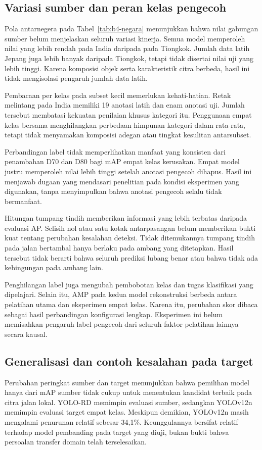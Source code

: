 \subsection{Variasi sumber dan peran kelas pengecoh}
Pola antarnegera pada Tabel~\ref{tab:b4-negara} menunjukkan bahwa nilai gabungan sumber belum menjelaskan seluruh variasi kinerja. Semua model memperoleh nilai yang lebih rendah pada India daripada pada Tiongkok. Jumlah data latih Jepang juga lebih banyak daripada Tiongkok, tetapi tidak disertai nilai uji yang lebih tinggi. Karena komposisi objek serta karakteristik citra berbeda, hasil ini tidak mengisolasi pengaruh jumlah data latih.

Pembacaan per kelas pada subset kecil memerlukan kehati-hatian. Retak melintang pada India memiliki 19 anotasi latih dan enam anotasi uji. Jumlah tersebut membatasi kekuatan penilaian khusus kategori itu. Penggunaan empat kelas bersama menghilangkan perbedaan himpunan kategori dalam rata-rata, tetapi tidak menyamakan komposisi adegan atau tingkat kesulitan antarsubset.

Perbandingan label tidak memperlihatkan manfaat yang konsisten dari penambahan D70 dan D80 bagi mAP empat kelas kerusakan. Empat model justru memperoleh nilai lebih tinggi setelah anotasi pengecoh dihapus. Hasil ini menjawab dugaan yang mendasari penelitian pada kondisi eksperimen yang digunakan, tanpa menyimpulkan bahwa anotasi pengecoh selalu tidak bermanfaat.

Hitungan tumpang tindih memberikan informasi yang lebih terbatas daripada evaluasi AP. Selisih nol atau satu kotak antarpasangan belum memberikan bukti kuat tentang perubahan kesalahan deteksi. Tidak ditemukannya tumpang tindih pada jalan bertambal hanya berlaku pada ambang yang ditetapkan. Hasil tersebut tidak berarti bahwa seluruh prediksi lubang benar atau bahwa tidak ada kebingungan pada ambang lain.

Penghilangan label juga mengubah pembobotan kelas dan tugas klasifikasi yang dipelajari. Selain itu, AMP pada kedua model rekonstruksi berbeda antara pelatihan utama dan eksperimen empat kelas. Karena itu, perubahan skor dibaca sebagai hasil perbandingan konfigurasi lengkap. Eksperimen ini belum memisahkan pengaruh label pengecoh dari seluruh faktor pelatihan lainnya secara kausal.

\subsection{Generalisasi dan contoh kesalahan pada target}
Perubahan peringkat sumber dan target menunjukkan bahwa pemilihan model hanya dari mAP sumber tidak cukup untuk menentukan kandidat terbaik pada citra jalan lokal. YOLO-RD memimpin evaluasi sumber, sedangkan YOLOv12n memimpin evaluasi target empat kelas. Meskipun demikian, YOLOv12n masih mengalami penurunan relatif sebesar 34,1\%. Keunggulannya bersifat relatif terhadap model pembanding pada target yang diuji, bukan bukti bahwa persoalan transfer domain telah terselesaikan.

